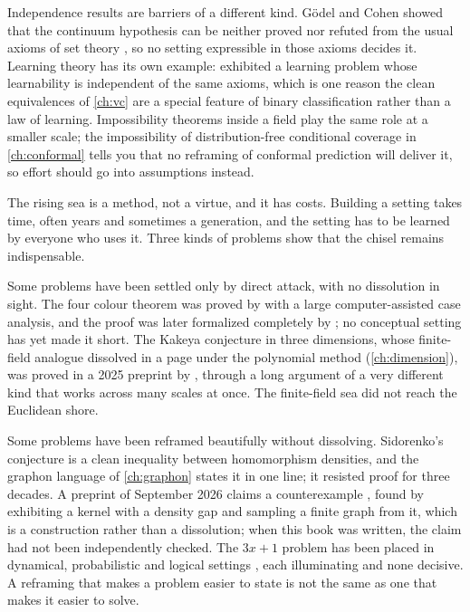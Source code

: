 \begin{refsection}
Independence results are barriers of a different kind. G\"odel and Cohen showed that the continuum hypothesis can be neither proved nor refuted from the usual axioms of set theory \parencite{Godel1940,Cohen1963}, so no setting expressible in those axioms decides it. Learning theory has its own example: \textcite{BenDavidEtAl2019} exhibited a learning problem whose learnability is independent of the same axioms, which is one reason the clean equivalences of \cref{ch:vc} are a special feature of binary classification rather than a law of learning. Impossibility theorems inside a field play the same role at a smaller scale; the impossibility of distribution-free conditional coverage in \cref{ch:conformal} tells you that no reframing of conformal prediction will deliver it, so effort should go into assumptions instead.


The rising sea is a method, not a virtue, and it has costs. Building a setting takes time, often years and sometimes a generation, and the setting has to be learned by everyone who uses it. Three kinds of problems show that the chisel remains indispensable.

Some problems have been settled only by direct attack, with no dissolution in sight. The four colour theorem was proved by \textcite{AppelHaken1977} with a large computer-assisted case analysis, and the proof was later formalized completely by \textcite{Gonthier2008}; no conceptual setting has yet made it short. The Kakeya conjecture in three dimensions, whose finite-field analogue dissolved in a page under the polynomial method (\cref{ch:dimension}), was proved in a 2025 preprint by \textcite{WangZahl2025}, through a long argument of a very different kind that works across many scales at once. The finite-field sea did not reach the Euclidean shore.

Some problems have been reframed beautifully without dissolving. Sidorenko's conjecture \parencite{Sidorenko1993} is a clean inequality between homomorphism densities, and the graphon language of \cref{ch:graphon} states it in one line; it resisted proof for three decades. A preprint of September 2026 claims a counterexample \parencite{OpenAI2026}, found by exhibiting a kernel with a density gap and sampling a finite graph from it, which is a construction rather than a dissolution; when this book was written, the claim had not been independently checked. The $3x+1$ problem has been placed in dynamical, probabilistic and logical settings \parencite{Lagarias1985}, each illuminating and none decisive. A reframing that makes a problem easier to state is not the same as one that makes it easier to solve.


\end{refsection}
